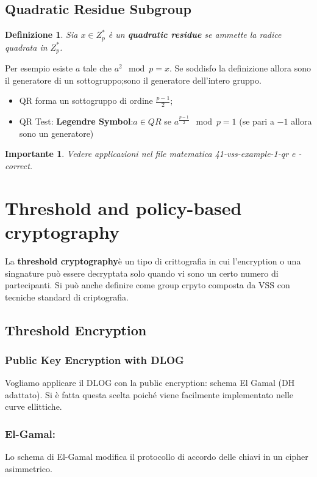 \documentclass{book}
\newtheorem{Definizione}{\textbf{Definizione}}
\newtheorem*{Importante}{\textbf{Importante}}
\begin{document}
\section{Quadratic Residue Subgroup}
\begin{Definizione}
    Sia \(x\in Z_{p}^{*}\) è un \textbf{quadratic residue} se ammette la radice quadrata in \(Z_{p}^{*}\).
\end{Definizione}
Per esempio esiste \(a\) tale che \(a^{2}\mod{p}=x\).\newline
Se soddisfo la definizione allora sono il generatore di un sottogruppo;\@altrimenti sono il generatore dell'intero gruppo.
\begin{itemize}
    \item QR forma un sottogruppo di ordine \(\frac{p-1}{2}\);
    \item QR Test: \textbf{Legendre Symbol}:\(a\in QR\) se \(a^{\frac{p-1}{2}}\mod{p}=1\) (se pari a \(-1\) allora sono un generatore)
\end{itemize}
\begin{Importante}
    Vedere applicazioni nel file matematica 41-vss-example-1-qr e -correct.
\end{Importante}
\chapter{Threshold and policy-based cryptography}
La \textbf{threshold cryptography}è un tipo di crittografia in cui l'encryption o una singnature può essere decryptata solo quando vi sono un certo numero di partecipanti. Si può anche definire come group crpyto composta da VSS con tecniche standard di criptografia\@.
\section{Threshold Encryption}
\subsection{Public Key Encryption with DLOG}
Vogliamo applicare il DLOG con la public encryption: schema El Gamal (DH adattato)\@. Si è fatta questa scelta poiché viene facilmente implementato nelle curve ellittiche\@.
\subsection{El-Gamal:\@background}
Lo schema di El-Gamal modifica il protocollo di accordo delle chiavi in un cipher asimmetrico\@.
\end{document}
